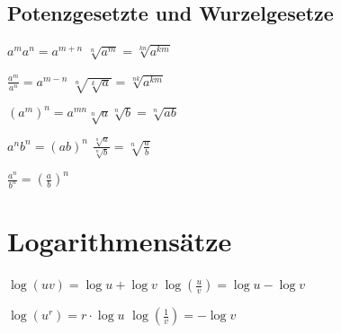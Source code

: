 \subsection{Potenzgesetzte und Wurzelgesetze}
    
	$a^m a^n = a^{m+n}$ \tab $\sqrt[n]{a^m} = \sqrt[kn]{a^{km}}$
	
	\noindent$\frac{a^m}{ a^n} = a^{m-n}$ \tab $\sqrt[n]{\sqrt[k]{a}} = \sqrt[nk]{a^{km}}$
	
	\noindent$(a^m)^n= a^{mn}$\tab $\sqrt[n]{a}\sqrt[n]{b}=\sqrt[n]{ab}$
	
	\noindent$a^n b^n = (ab)^n$ \tab $\frac{\sqrt[n]{a}}{\sqrt[n]{b}}= \sqrt[n]{\frac{a}{b}}$
	
	\noindent$\frac{a^n}{b^n} = (\frac{a}{b})^n$\\


	
    \section{Logarithmensätze}
    
	$\log(uv) = \log u +\log v$ \hspace{0.05cm} $\log(\frac{u}{v}) = \log u -\log v$
	
	\noindent$\log(u^r) = r\cdot \log u$ \tab $\log(\frac{1}{v}) = -\log v$\\

\vfill
